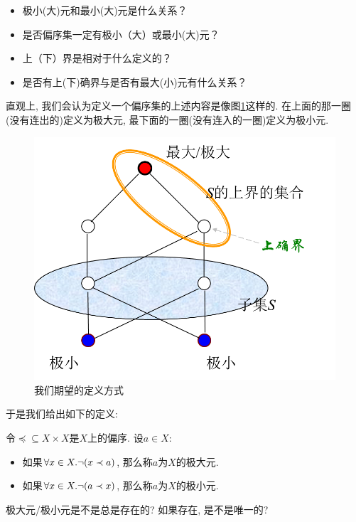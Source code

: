 \begin{itemize}
	\item 极小(大)元和最小(大)元是什么关系？
	\item 是否偏序集一定有极小（大）或最小(大)元？
	\item 上（下）界是相对于什么定义的？
	\item 是否有上(下)确界与是否有最大(小)元有什么关系？
\end{itemize}

直观上, 我们会认为定义一个偏序集的上述内容是像图\ref{figs:part-ord}这样的. 在上面的那一圈(没有连出的)定义为极大元, 最下面的一圈(没有连入的一圈)定义为极小元. 

\begin{figure}
	\centering
	\includegraphics[scale=0.6]{3-set-theory/figs/part-ord}
	\caption{我们期望的定义方式}
	\label{figs:part-ord}
\end{figure}

于是我们给出如下的定义: 

\begin{definition}
	令$\preceq\subseteq X \times X$是$X$上的偏序. 设$a\in X$: 
	\begin{itemize}
		\item 如果$\forall x\in X. \lnot (x\prec a)$, 那么称$a$为$X$的极大元. 
		\item 如果$\forall x\in X. \lnot (a\prec x)$, 那么称$a$为$X$的极小元.
	\end{itemize} 
\end{definition}

\begin{bonus}
	极大元/极小元是不是总是存在的? 如果存在, 是不是唯一的? 
\end{bonus}

